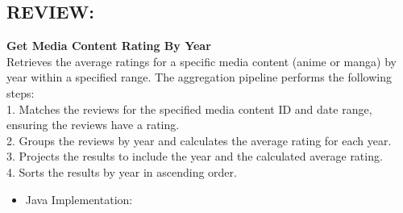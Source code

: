 \subsection*{REVIEW:}
\textbf{Get Media Content Rating By Year}\\
Retrieves the average ratings for a specific media content (anime or manga) by year within a specified range.
The aggregation pipeline performs the following steps:\\
1. Matches the reviews for the specified media content ID and date range, ensuring the reviews have a rating.\\
2. Groups the reviews by year and calculates the average rating for each year.\\
3. Projects the results to include the year and the calculated average rating.\\
4. Sorts the results by year in ascending order.
\begin{itemize}
    \item Java Implementation:
\end{itemize}
